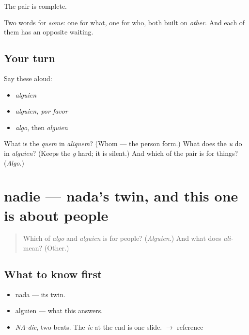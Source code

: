 \begin{grammarlens}[title={What you've built}]
The pair is complete.

Two words for \emph{some}: one for what, one for who, both built on \emph{other}. And each of them has an opposite waiting.
\end{grammarlens}

\subsection*{Your turn}
Say these aloud:

\begin{itemize}
\raggedright
  \item \emph{alguien}
  \item \emph{alguien, por favor}
  \item \emph{algo}, then \emph{alguien}
\end{itemize}

\begin{tcolorbox}[breakable,colback=teal!4,colframe=teal!35!black,title={Before you move on}]
What is the \emph{quem} in \emph{aliquem}? (Whom — the person form.) What does the \emph{u} do in \emph{alguien}? (Keeps the \emph{g} hard; it is silent.) And which of the pair is for things? (\emph{Algo}.)
\end{tcolorbox}
\section[nadie]{nadie — nada's twin, and this one is about people}

\label{lesson:ES-C317-nadie}



\begin{quote}
Which of \emph{algo} and \emph{alguien} is for people? (\emph{Alguien}.) And what does \emph{ali-} mean? (Other.)
\end{quote}

\subsection*{What to know first}
\begin{itemize}
\raggedright
  \item nada — its twin.
  \item alguien — what this answers.
\end{itemize}

\begin{sounds}
\begin{itemize}
\raggedright
  \item \emph{NA-die}, two beats. The \emph{ie} at the end is one slide. $\to$ reference
\end{itemize}
\end{sounds}

